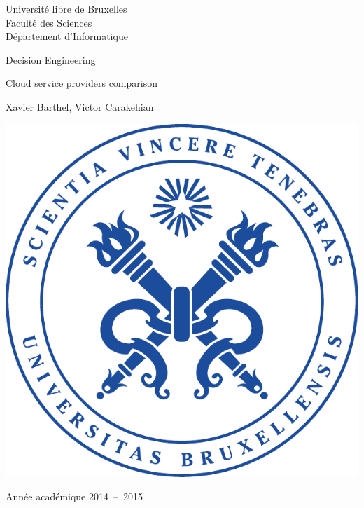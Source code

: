 \documentclass[a4paper,11pt]{article}
\begin{document}
\begin{titlepage}
\begin{center}
	{\sc Université libre de Bruxelles}\\
	Faculté des Sciences\\
	Département d'Informatique
	\vfill{}\vfill{}

	{\Huge \par}{\Huge Decision Engineering}{\Huge \par}
	{\Huge \par}{\huge Cloud service providers comparison}{\Huge \par}

	{\huge \par}{\Large Xavier Barthel, }
				{\Large Victor Carakehian}{\huge \par}
	
	\vfill{}
	\includegraphics{img/ulb_symbol.pdf}

	\vfill{}\vfill{}
	Année académique 2014~--~2015
\end{center}
\end{titlepage}
\end{document}
